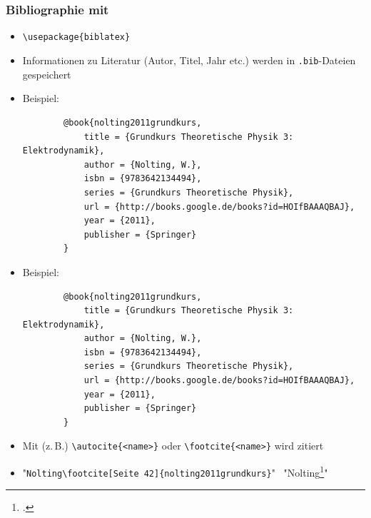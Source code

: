 \section{}

\begin{frame}[<+->][fragile]
	\frametitle{Bibliographie mit }
	
	\begin{itemize}
		\item \lstinline!\usepackage{biblatex}!
		\item Informationen zu Literatur (Autor, Titel, Jahr etc.) werden in \texttt{.bib}-Dateien gespeichert
		\item Beispiel:
		\begin{lstlisting}
		@book{nolting2011grundkurs,
		    title = {Grundkurs Theoretische Physik 3: Elektrodynamik},
		    author = {Nolting, W.},
		    isbn = {9783642134494},
		    series = {Grundkurs Theoretische Physik},
		    url = {http://books.google.de/books?id=HOIfBAAAQBAJ},
		    year = {2011},
		    publisher = {Springer}
		}
		\end{lstlisting}
	\end{itemize}
\end{frame}

\begin{frame}[<+->][fragile]
	\begin{itemize}
		\item Beispiel:
		\begin{lstlisting}
		@book{nolting2011grundkurs,
		    title = {Grundkurs Theoretische Physik 3: Elektrodynamik},
		    author = {Nolting, W.},
		    isbn = {9783642134494},
		    series = {Grundkurs Theoretische Physik},
		    url = {http://books.google.de/books?id=HOIfBAAAQBAJ},
		    year = {2011},
		    publisher = {Springer}
		}
		\end{lstlisting}
		\item Mit (z.\,B.) \lstinline!\autocite{<name>}! oder \lstinline!\footcite{<name>}! wird zitiert
		\item "\lstinline!Nolting\footcite[Seite 42]{nolting2011grundkurs}!" \textrightarrow~"Nolting\footcite[Seite 42]{nolting2011grundkurs}"
	\end{itemize}
\end{frame}

